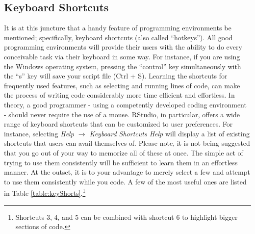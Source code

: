 \subsection{Keyboard Shortcuts}
\label{sec:key_short}

It is at this juncture that a handy feature of programming environments be mentioned; specifically, keyboard shortcuts (also called ``hotkeys''). All good programming environments will provide their users with the ability to do every conceivable task via their keyboard in some way. For instance, if you are using the Windows operating system, pressing the ``control'' key simultaneously with the ``s'' key will save your script file (Ctrl + S). Learning the shortcuts for frequently used features, such as selecting and running lines of code, can make the process of writing code considerably more time efficient and effortless.  In theory, a good programmer - using a competently developed coding environment - should never require the use of a mouse.  RStudio, in particular, offers a wide range of keyboard shortcuts that can be customized to user preferences.  For instance, selecting \textit{Help $\rightarrow$ Keyboard Shortcuts Help} will display a list of existing shortcuts that users can avail themselves of.  Please note, it is not being suggested that you go out of your way to memorize all of these at once. The simple act of trying to use them consistently will be sufficient to learn them in an effortless manner. At the outset, it is to your advantage to merely select a few and attempt to use them consistently while you code. A few of the most useful ones are listed in Table \ref{table:keyShorts}.\footnote{Shortcuts 3, 4, and 5 can be combined with shortcut 6 to highlight bigger sections of code.}

\vspace{1em}



